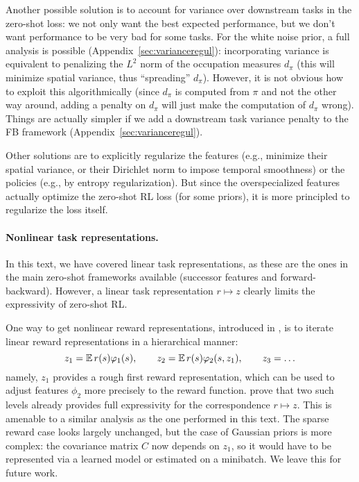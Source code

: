 \documentclass[11pt,a4paper]{article}
\begin{document}
Another possible solution is to account for variance over downstream
tasks in the zero-shot loss: we not only want the best expected
performance, but we don't want performance to be very bad for some tasks.
For the white noise prior, a full analysis is possible
(Appendix~\ref{sec:varianceregul}): incorporating variance is equivalent
to penalizing the $L^2$ norm of the occupation measures $d_\pi$ (this
will minimize spatial variance, thus ``spreading'' $d_\pi$). However,
it is not obvious how to exploit this algorithmically (since $d_\pi$ is
computed from $\pi$ and not the other way around, adding a penalty on
$d_\pi$ will just make the computation of $d_\pi$ wrong). Things are
actually simpler if we add a downstream task variance penalty to the FB
framework (Appendix~\ref{sec:varianceregul}).

Other solutions are to explicitly regularize the features (e.g., minimize
their spatial variance, or their Dirichlet norm to impose temporal
smoothness) or the policies (e.g., by entropy regularization). But since
the overspecialized features actually optimize the zero-shot RL loss (for
some priors), it is more principled to regularize the loss itself.

\paragraph{Nonlinear task representations.} In this text, we have covered
linear task representations, as these are the ones in the main zero-shot
frameworks available (successor features and forward-backward). However,
a linear task representation $r\mapsto z$ clearly limits the
expressivity of zero-shot RL.

One way to get nonlinear
reward representations, introduced in \cite{fb-aware}, is to iterate
linear reward representations in a hierarchical manner:
\begin{equation}
z_1=\mathbb{E}\, r(s)\varphi_1(s),\qquad z_2=\mathbb{E}\,r(s) \varphi_2(s,z_1),\qquad z_3=\ldots
\end{equation}
namely, $z_1$ provides a rough first reward representation, which can be
used to adjust features 
$\phi_2$ more precisely to the reward function. \cite{fb-aware} prove
that two such levels already provides full expressivity for the correspondence $r\mapsto z$.
This is amenable to a similar analysis as
the one performed in this text. The sparse reward case looks largely
unchanged, but the case of Gaussian priors is more complex: the
covariance matrix $C$ now depends on $z_1$, so it would have to be
represented via a learned model or estimated on a minibatch. We leave
this for future work.
\end{document}
